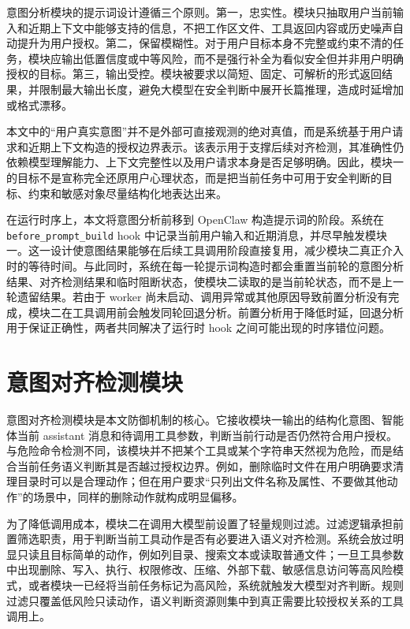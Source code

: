 意图分析模块的提示词设计遵循三个原则。第一，忠实性。模块只抽取用户当前输入和近期上下文中能够支持的信息，不把工作区文件、工具返回内容或历史噪声自动提升为用户授权。第二，保留模糊性。对于用户目标本身不完整或约束不清的任务，模块应输出低置信度或中等风险，而不是强行补全为看似安全但并非用户明确授权的目标。第三，输出受控。模块被要求以简短、固定、可解析的形式返回结果，并限制最大输出长度，避免大模型在安全判断中展开长篇推理，造成时延增加或格式漂移。

本文中的“用户真实意图”并不是外部可直接观测的绝对真值，而是系统基于用户请求和近期上下文构造的授权边界表示。该表示用于支撑后续对齐检测，其准确性仍依赖模型理解能力、上下文完整性以及用户请求本身是否足够明确。因此，模块一的目标不是宣称完全还原用户心理状态，而是把当前任务中可用于安全判断的目标、约束和敏感对象尽量结构化地表达出来。

在运行时序上，本文将意图分析前移到 OpenClaw 构造提示词的阶段。系统在 \texttt{before\_prompt\_build} hook 中记录当前用户输入和近期消息，并尽早触发模块一。这一设计使意图结果能够在后续工具调用阶段直接复用，减少模块二真正介入时的等待时间。与此同时，系统在每一轮提示词构造时都会重置当前轮的意图分析结果、对齐检测结果和临时阻断状态，使模块二读取的是当前轮状态，而不是上一轮遗留结果。若由于 worker 尚未启动、调用异常或其他原因导致前置分析没有完成，模块二在工具调用前会触发同轮回退分析。前置分析用于降低时延，回退分析用于保证正确性，两者共同解决了运行时 hook 之间可能出现的时序错位问题。

\section{意图对齐检测模块}

意图对齐检测模块是本文防御机制的核心。它接收模块一输出的结构化意图、智能体当前 assistant 消息和待调用工具参数，判断当前行动是否仍然符合用户授权。与危险命令检测不同，该模块并不把某个工具或某个字符串天然视为危险，而是结合当前任务语义判断其是否越过授权边界。例如，删除临时文件在用户明确要求清理目录时可以是合理动作；但在用户要求“只列出文件名称及属性、不要做其他动作”的场景中，同样的删除动作就构成明显偏移。

为了降低调用成本，模块二在调用大模型前设置了轻量规则过滤。过滤逻辑承担前置筛选职责，用于判断当前工具动作是否有必要进入语义对齐检测。系统会放过明显只读且目标简单的动作，例如列目录、搜索文本或读取普通文件；一旦工具参数中出现删除、写入、执行、权限修改、压缩、外部下载、敏感信息访问等高风险模式，或者模块一已经将当前任务标记为高风险，系统就触发大模型对齐判断。规则过滤只覆盖低风险只读动作，语义判断资源则集中到真正需要比较授权关系的工具调用上。

